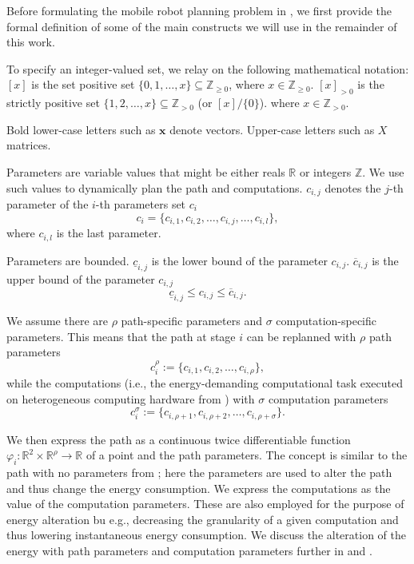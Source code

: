 Before formulating the mobile robot planning problem in , we first provide the formal definition of some of the main constructs we will use in the remainder of this work.

To specify an integer-valued set, we relay on the following mathematical notation: $[x]$ is the set positive set $\{0,1,\dots,x\}\subseteq\mathbb{Z}_{\geq 0}$, where $x\in\mathbb{Z}_{\geq 0}$. $[x]_{>0}$ is the strictly positive set $\{1,2,\dots,x\}\subseteq\mathbb{Z}_{> 0}$ (or $[x]/\{0\}$). where $x\in\mathbb{Z}_{>0}$. 

Bold lower-case letters such as $\mathbf{x}$ denote vectors. Upper-case letters such as $X$ matrices.

Parameters are variable values that might be either reals $\mathbb{R}$ or integers $\mathbb{Z}$. We use such values to dynamically plan the path and computations. $c_{i,j}$ denotes the $j$-th parameter of the $i$-th parameters set $c_i$
\begin{equation}
  c_i=\{c_{i,1},c_{i,2},\dots,c_{i,j},\dots,c_{i,l}\},
\end{equation}
where $c_{i,l}$ is the last parameter.

Parameters are bounded. $\underline{c}_{i,j}$ is the lower bound of the parameter $c_{i,j}$. $\overline{c}_{i,j}$ is the upper bound of the parameter $c_{i,j}$
\begin{equation}
  \underline{c}_{i,j}\leq c_{i,j}\leq\overline{c}_{i,j}.
\end{equation}

We assume there are $\rho$ path-specific parameters and $\sigma$ computation-specific parameters. This means that the path at stage $i$ can be replanned with $\rho$ path parameters
\begin{equation}\label{eq:path-params}
    c_i^\rho:=\{c_{i,1},c_{i,2},\dots,c_{i,\rho}\},
\end{equation}
while the computations (i.e., the energy-demanding computational task executed on heterogeneous computing hardware from ) with $\sigma$ computation parameters 
\begin{equation}\label{eq:comp-params}
    c_i^\sigma:=\{c_{i,\rho+1},c_{i,\rho+2},\dots,c_{i,\rho+\sigma}\}.
\end{equation}

We then express the path as a continuous twice differentiable function $\varphi_i:\mathbb{R}^2\times\mathbb{R}^\rho\rightarrow\mathbb{R}$ of a point and the path parameters. The concept is similar to the path with no parameters from ; here the parameters are used to alter the path and thus change the energy consumption. We express the computations as the value of the computation parameters. These are also employed for the purpose of energy alteration bu e.g., decreasing the granularity of a given computation and thus lowering instantaneous energy consumption. We discuss the alteration of the energy with path parameters and computation parameters further in  and .

